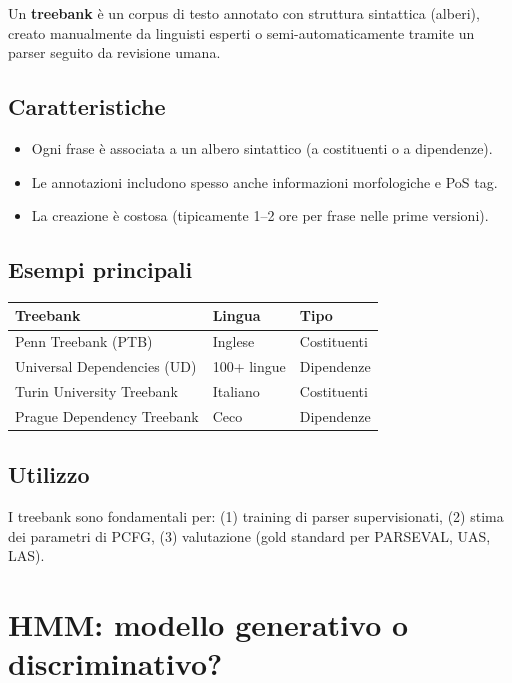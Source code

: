 \documentclass[12pt,a4paper]{article}
\begin{document}
Un \textbf{treebank} è un corpus di testo annotato con struttura sintattica (alberi), creato manualmente da linguisti esperti o semi-automaticamente tramite un parser seguito da revisione umana.

\subsection{Caratteristiche}
\begin{itemize}[leftmargin=1.5em]
  \item Ogni frase è associata a un albero sintattico (a costituenti o a dipendenze).
  \item Le annotazioni includono spesso anche informazioni morfologiche e PoS tag.
  \item La creazione è costosa (tipicamente 1--2 ore per frase nelle prime versioni).
\end{itemize}

\subsection{Esempi principali}
\begin{center}
\begin{tabular}{lll}
\toprule
\textbf{Treebank} & \textbf{Lingua} & \textbf{Tipo} \\
\midrule
Penn Treebank (PTB) & Inglese & Costituenti \\
Universal Dependencies (UD) & 100+ lingue & Dipendenze \\
Turin University Treebank & Italiano & Costituenti \\
Prague Dependency Treebank & Ceco & Dipendenze \\
\bottomrule
\end{tabular}
\end{center}

\subsection{Utilizzo}
I treebank sono fondamentali per: (1) training di parser supervisionati, (2) stima dei parametri di PCFG, (3) valutazione (gold standard per PARSEVAL, UAS, LAS).

\section{HMM: modello generativo o discriminativo?}
\end{document}
